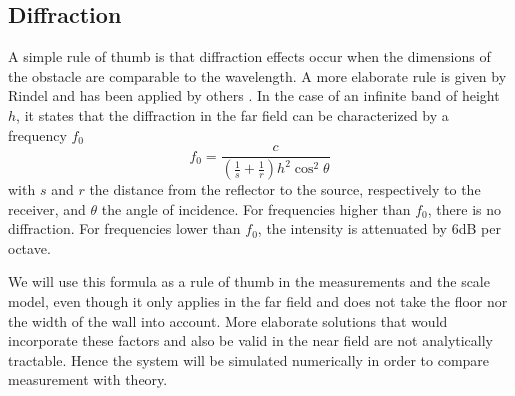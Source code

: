 \subsection{Diffraction}

A simple rule of thumb is that diffraction effects occur when the dimensions of the obstacle are comparable to the wavelength. A more elaborate rule is given by Rindel \cite{rindel-diffraction} and has been applied by others \cite{davy-diffraction, stage-acoustics}. In the case of an infinite band of height $h$, it states that the diffraction in the far field can be characterized by a frequency $f_0$
\begin{equation}
\label{diffractionEq}
f_0 = \frac{c}{
	\left(\frac{1}{s} + \frac{1}{r}\right) h^2 \cos^2 \theta}
\end{equation}
with $s$ and $r$ the distance from the reflector to the source, respectively to the receiver, and $\theta$ the angle of incidence. For frequencies higher than $f_0$, there is no diffraction. For frequencies lower than $f_0$, the intensity is attenuated by 6dB per octave. 

We will use this formula as a rule of thumb in the measurements and the scale model, even though it only applies in the far field and does not take the floor nor the width of the wall into account. More elaborate solutions that would incorporate these factors and also be valid in the near field are not analytically tractable. Hence the system will be simulated numerically in order to compare measurement with theory.


